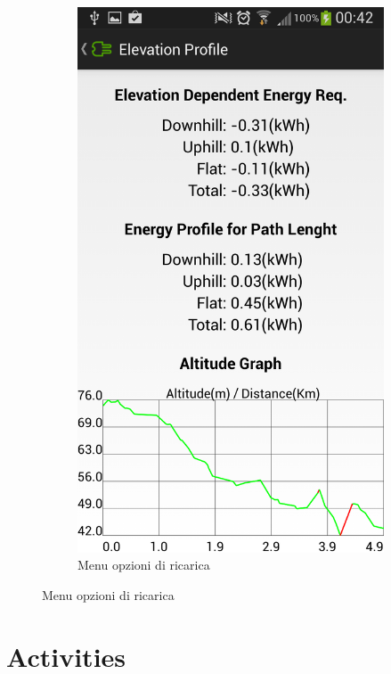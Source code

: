 \begin{figure}
\begin{subfigure}{0.45\textwidth}
		\includegraphics[width=\textwidth]{assets/mobile-app-altimetry-3.png}
		\caption{Menu opzioni di ricarica}
		\label{fig:altimetry-3}
    \end{subfigure}
\end{figure}

\section{Activities}
